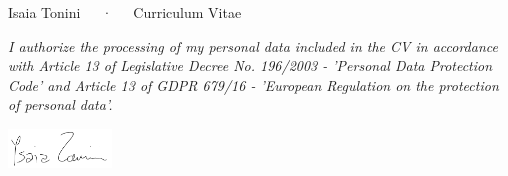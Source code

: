 \documentclass[11pt, a4paper]{awesome-cv}
\begin{document}
  \makecvheader[C]

  \makecvfooter {\today} {{Isaia Tonini}~~~·~~~Curriculum Vitae} {\thepage}

  
  
  
  
  
  

  \newcommand{\datipersonali}{\footnotesize
  \color{gray}
  \itshape I authorize the processing of my personal data included in the CV in
  accordance with Article 13 of Legislative Decree No. 196/2003 - 'Personal Data
  Protection Code' and Article 13 of GDPR 679/16 - 'European Regulation on the
  protection of personal data'.}

  \vfill %

  \datipersonali\\[2ex] \hfill
  \begin{minipage}[b]{0.95\textwidth}
    \hspace*{\fill}
    \includegraphics[width=2.75cm]{
      firma-no-bg.png
    } %
  \end{minipage}

\end{document}
